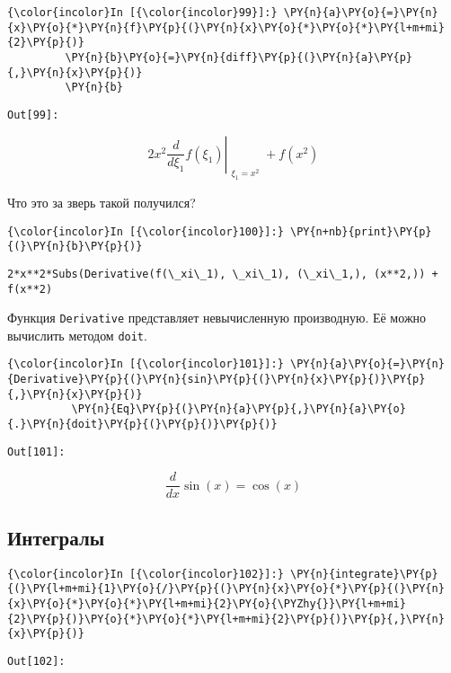     \begin{Verbatim}[commandchars=\\\{\}]
{\color{incolor}In [{\color{incolor}99}]:} \PY{n}{a}\PY{o}{=}\PY{n}{x}\PY{o}{*}\PY{n}{f}\PY{p}{(}\PY{n}{x}\PY{o}{*}\PY{o}{*}\PY{l+m+mi}{2}\PY{p}{)}
         \PY{n}{b}\PY{o}{=}\PY{n}{diff}\PY{p}{(}\PY{n}{a}\PY{p}{,}\PY{n}{x}\PY{p}{)}
         \PY{n}{b}
\end{Verbatim}
\texttt{\color{outcolor}Out[{\color{outcolor}99}]:}
    
    \[2 x^{2} \left. \frac{d}{d \xi_{1}} f{\left (\xi_{1} \right )} \right|_{\substack{ \xi_{1}=x^{2} }} + f{\left (x^{2} \right )}\]

    

    Что это за зверь такой получился?

    \begin{Verbatim}[commandchars=\\\{\}]
{\color{incolor}In [{\color{incolor}100}]:} \PY{n+nb}{print}\PY{p}{(}\PY{n}{b}\PY{p}{)}
\end{Verbatim}

    \begin{Verbatim}[commandchars=\\\{\}]
2*x**2*Subs(Derivative(f(\_xi\_1), \_xi\_1), (\_xi\_1,), (x**2,)) + f(x**2)

    \end{Verbatim}

    Функция \texttt{Derivative} представляет невычисленную производную. Её
можно вычислить методом \texttt{doit}.

    \begin{Verbatim}[commandchars=\\\{\}]
{\color{incolor}In [{\color{incolor}101}]:} \PY{n}{a}\PY{o}{=}\PY{n}{Derivative}\PY{p}{(}\PY{n}{sin}\PY{p}{(}\PY{n}{x}\PY{p}{)}\PY{p}{,}\PY{n}{x}\PY{p}{)}
          \PY{n}{Eq}\PY{p}{(}\PY{n}{a}\PY{p}{,}\PY{n}{a}\PY{o}{.}\PY{n}{doit}\PY{p}{(}\PY{p}{)}\PY{p}{)}
\end{Verbatim}
\texttt{\color{outcolor}Out[{\color{outcolor}101}]:}
    
    \[\frac{d}{d x} \sin{\left (x \right )} = \cos{\left (x \right )}\]

    

\subsection{Интегралы}
\label{sympy08}

    \begin{Verbatim}[commandchars=\\\{\}]
{\color{incolor}In [{\color{incolor}102}]:} \PY{n}{integrate}\PY{p}{(}\PY{l+m+mi}{1}\PY{o}{/}\PY{p}{(}\PY{n}{x}\PY{o}{*}\PY{p}{(}\PY{n}{x}\PY{o}{*}\PY{o}{*}\PY{l+m+mi}{2}\PY{o}{\PYZhy{}}\PY{l+m+mi}{2}\PY{p}{)}\PY{o}{*}\PY{o}{*}\PY{l+m+mi}{2}\PY{p}{)}\PY{p}{,}\PY{n}{x}\PY{p}{)}
\end{Verbatim}
\texttt{\color{outcolor}Out[{\color{outcolor}102}]:}
    
